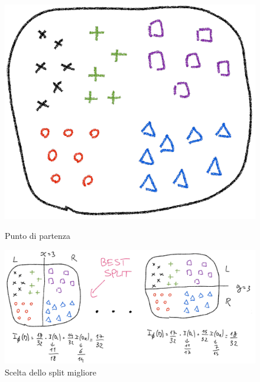 	\begin{figure}
		\centering
		\begin{minipage}{.4\textwidth}
			\centering
			\includegraphics[width=0.8\linewidth]{imgs/chapter5/img9}
			\caption{Punto di partenza}
			\label{fig:chapter05-09}
		\end{minipage}%
		\begin{minipage}{.6\textwidth}
			\centering
			\includegraphics[width=1\linewidth]{imgs/chapter5/img10}
			\caption{Scelta dello split migliore}
			\label{fig:chapter05-10}
		\end{minipage}
	\end{figure}
	
